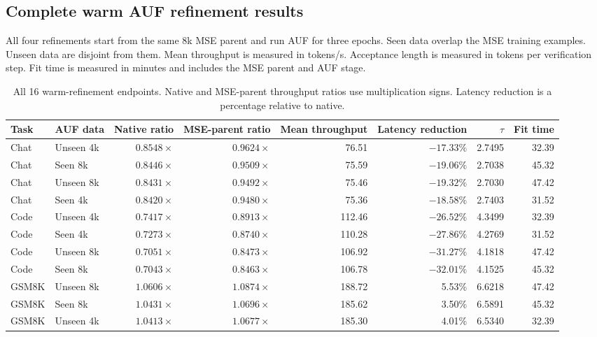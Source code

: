 \FloatBarrier
\subsection{Complete warm AUF refinement results}
\label{app:warm-full}

All four refinements start from the same 8k MSE parent and run AUF for three epochs. Seen data overlap the MSE training examples. Unseen data are disjoint from them. Mean throughput is measured in tokens/s. Acceptance length is measured in tokens per verification step. Fit time is measured in minutes and includes the MSE parent and AUF stage.

\begin{table}[htbp]
\centering
\caption{All 16 warm-refinement endpoints. Native and MSE-parent throughput ratios use multiplication signs. Latency reduction is a percentage relative to native.}
\label{tab:app-warm}
\scriptsize
\begin{tabular}{llrrrrrr}
\toprule
Task & AUF data & Native ratio & MSE-parent ratio & Mean throughput & Latency reduction & $\tau$ & Fit time \\
\midrule
Chat & Unseen 4k & $0.8548\times$ & $0.9624\times$ & 76.51 & $-17.33\%$ & 2.7495 & 32.39 \\
Chat & Seen 8k & $0.8446\times$ & $0.9509\times$ & 75.59 & $-19.06\%$ & 2.7038 & 45.32 \\
Chat & Unseen 8k & $0.8431\times$ & $0.9492\times$ & 75.46 & $-19.32\%$ & 2.7030 & 47.42 \\
Chat & Seen 4k & $0.8420\times$ & $0.9480\times$ & 75.36 & $-18.58\%$ & 2.7403 & 31.52 \\
Code & Unseen 4k & $0.7417\times$ & $0.8913\times$ & 112.46 & $-26.52\%$ & 4.3499 & 32.39 \\
Code & Seen 4k & $0.7273\times$ & $0.8740\times$ & 110.28 & $-27.86\%$ & 4.2769 & 31.52 \\
Code & Unseen 8k & $0.7051\times$ & $0.8473\times$ & 106.92 & $-31.27\%$ & 4.1818 & 47.42 \\
Code & Seen 8k & $0.7043\times$ & $0.8463\times$ & 106.78 & $-32.01\%$ & 4.1525 & 45.32 \\
GSM8K & Unseen 8k & $1.0606\times$ & $1.0874\times$ & 188.72 & 5.53\% & 6.6218 & 47.42 \\
GSM8K & Seen 8k & $1.0431\times$ & $1.0696\times$ & 185.62 & 3.50\% & 6.5891 & 45.32 \\
GSM8K & Unseen 4k & $1.0413\times$ & $1.0677\times$ & 185.30 & 4.01\% & 6.5340 & 32.39 \\

\end{tabular}
\end{table}
